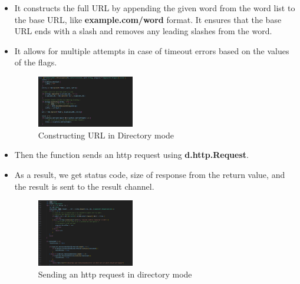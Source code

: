 \documentclass[12 pt]{article}
\begin{document}
\begin{itemize}
    \item It constructs the full URL by appending the given word from the word list to the base URL, like \textbf{example.com/word} format. It ensures that the base URL ends with a slash and removes any leading slashes from the word.
    \item It allows for multiple attempts in case of timeout errors based on the values of the flags.
    \begin{figure}[!htbp]
        \centering
        \includegraphics[width=0.4\textwidth]{Gobusterdir_Constructing_Url.png}
        \caption{Constructing URL in Directory mode}
        \label{fig: Directory Mode Constructing URL}
    \end{figure}
    \item Then the function sends an http request using \textbf{d.http.Request}.
    \item As a result, we get status code, size of response from the return value, and the result is sent to the result channel.
    \begin{figure}[!htbp]
        \centering
        \includegraphics[width=0.4\textwidth]{Gobusterdir_Http_Request.png}
        \caption{Sending an http request in directory mode}
        \label{fig: Directory Mode HTTP Request}
    \end{figure}
\end{itemize}
\end{document}
